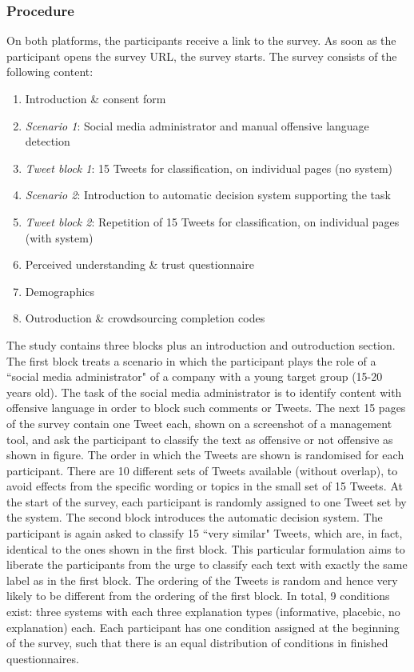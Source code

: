 \subsubsection{Procedure}
On both platforms, the participants receive a link to the survey. As soon as the participant opens the survey URL, the survey starts. The survey consists of the following content:
\begin{enumerate}
	\item Introduction \& consent form
	\item \textit{Scenario 1}: Social media administrator and manual offensive language detection
	\item \textit{Tweet block 1}: 15 Tweets for classification, on individual pages (no system)
	\item \textit{Scenario 2}: Introduction to automatic decision system supporting the task
	\item \textit{Tweet block 2}: Repetition of 15 Tweets for classification, on individual pages (with system)
	\item Perceived understanding \& trust questionnaire
	\item Demographics
	\item Outroduction \& crowdsourcing completion codes
\end{enumerate}
The study contains three blocks plus an introduction and outroduction section. The first block treats a scenario in which the participant plays the role of a ``social media administrator" of a company with a young target group (15-20 years old). The task of the social media administrator is to identify content with offensive language in order to block such comments or Tweets. The next 15 pages of the survey contain one Tweet each, shown on a screenshot of a management tool, and ask the participant to classify the text as offensive or not offensive as shown in figure. The order in which the Tweets are shown is randomised for each participant. There are 10 different sets of Tweets available (without overlap), to avoid effects from the specific wording or topics in the small set of 15 Tweets. At the start of the survey, each participant is randomly assigned to one Tweet set by the system.\newline
The second block introduces the automatic decision system. The participant is again asked to classify 15 ``very similar" Tweets, which are, in fact, identical to the ones shown in the first block. This particular formulation aims to liberate the participants from the urge to classify each text with exactly the same label as in the first block. The ordering of the Tweets is random and hence very likely to be different from the ordering of the first block. In total, 9 conditions exist: three systems with each three explanation types (informative, placebic, no explanation) each. Each participant has one condition assigned at the beginning of the survey, such that there is an equal distribution of conditions in finished questionnaires. \newline
